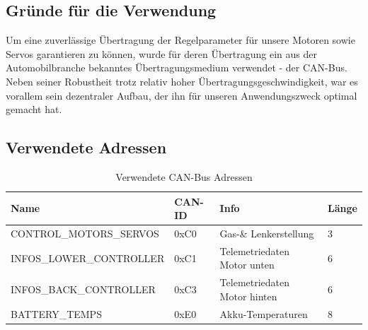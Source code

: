 \subsection{Gründe für die Verwendung}
Um eine zuverlässige Übertragung der Regelparameter für unsere Motoren sowie Servos garantieren zu können, wurde für deren Übertragung ein aus der Automobilbranche bekanntes Übertragungsmedium verwendet - der CAN-Bus. 
Neben seiner Robustheit trotz relativ hoher Übertragungsgeschwindigkeit, war es vorallem sein dezentraler Aufbau, der ihn für unseren Anwendungszweck optimal gemacht hat.

\newpage

\subsection{Verwendete Adressen}
\begin{table}[h]
    \begin{tabular}{|l|l|l|l|}
        \hline
    Name                              & CAN-ID & Info         & Länge \\\hline
    CONTROL\_MOTORS\_SERVOS  & 0xC0   & Gas-\& Lenkerstellung & 3     \\
    INFOS\_LOWER\_CONTROLLER & 0xC1   & Telemetriedaten Motor unten  & 6     \\
    INFOS\_BACK\_CONTROLLER  & 0xC3   & Telemetriedaten Motor hinten & 6     \\
    BATTERY\_TEMPS           & 0xE0   & Akku-Temperaturen            & 8    \\\hline
    \end{tabular}
    \caption{Verwendete CAN-Bus Adressen}
\end{table}
